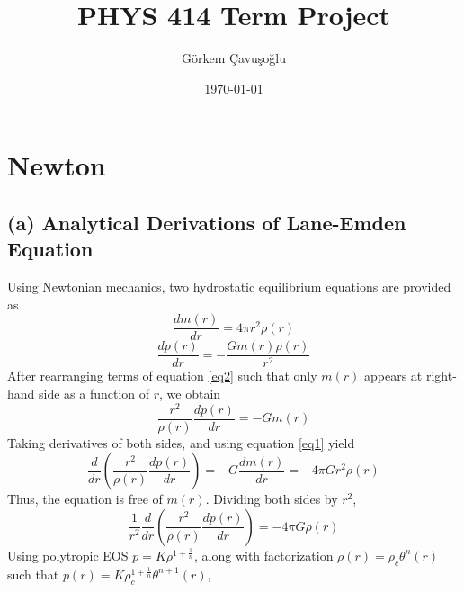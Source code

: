 \documentclass[aps,twocolumn,showpacs,preprintnumbers,nofootinbib,prl,superscriptaddress,groupedaddress]{revtex4-2}
\begin{document}
\title{PHYS 414 Term Project}
\author{G\"{o}rkem \c{C}avu\c{s}o\u{g}lu} %
\date{\today}

\begin{abstract}
\end{abstract}
\maketitle


\section{Newton}


\subsection{(a) Analytical Derivations of Lane-Emden Equation}
Using Newtonian mechanics, two hydrostatic equilibrium equations are provided as
\begin{equation}\label{eq1}
	\frac{d m(r)}{dr}= 4\pi r^2 \rho(r)
\end{equation}
\begin{equation}\label{eq2}
	\frac{dp(r)}{dr} = -\frac{Gm(r)\rho(r)}{r^2}
\end{equation}
After rearranging terms of equation \ref{eq2} such that only $m(r)$ appears at right-hand side as a function of $r$, we obtain
\begin{equation}
	\frac{r^2}{\rho(r)}\frac{dp(r)}{dr} = -Gm(r)
\end{equation}
Taking derivatives of both sides, and using equation \ref{eq1} yield
\begin{equation}
	\frac{d}{dr}(\frac{r^2}{\rho(r)}\frac{dp(r)}{dr}) = -G\frac{dm(r)}{dr}= -4\pi G r^2 \rho(r)
\end{equation}
Thus, the equation is free of $m(r)$. Dividing both sides by $r^2$,
\begin{equation}
	\frac{1}{r^2}\frac{d}{dr}(\frac{r^2}{\rho(r)}\frac{dp(r)}{dr}) = -4\pi G  \rho(r)
\end{equation}
Using polytropic EOS $p = K\rho^{1+\frac{1}{n}}$, along with factorization $\rho(r) = \rho_c\theta^n(r)$ such that $p(r) = 
K\rho_c^{1+\frac{1}{n}}\theta^{n+1}(r)$,
\end{document}
